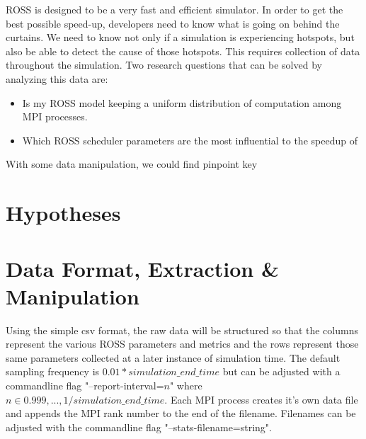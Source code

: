 \documentclass[12pt]{article}
\begin{document}
ROSS is designed to be a very fast and efficient simulator. In order to get the best possible speed-up, developers need to know what is going on behind the curtains. We need to know not only if a simulation is experiencing hotspots, but also be able to detect the cause of those hotspots. This requires collection of data throughout the simulation. Two research questions that can be solved by analyzing this data are:

\begin{itemize}
  \item Is my ROSS model keeping a uniform distribution of computation among MPI processes.
  \item Which ROSS scheduler parameters are the most influential to the speedup of 
\end{itemize}

With some data manipulation, we could find pinpoint key 

\section{Hypotheses}

\section{Data Format, Extraction \& Manipulation}

Using the simple csv format, the raw data will be structured so that the columns represent the various ROSS parameters and metrics and the rows represent those same parameters collected at a later instance of simulation time. The default sampling frequency is $0.01*simulation\_end\_time$ but can be adjusted with a commandline flag "--report-interval=$n$" where $n\in {0.999, ..., 1/simulation\_end\_time}$. Each MPI process creates it's own data file and appends the MPI rank number to the end of the filename. Filenames can be adjusted with the commandline flag "--stats-filename=string".
\end{document}

